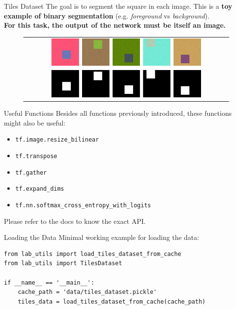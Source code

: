 \documentclass[aspectratio=169]{beamer}
\begin{document}

\begin{frame}{Tiles Dataset}
The goal is to segment the square in each image. This is a \textbf{toy example of binary segmentation} (e.g. \textit{foreground} vs \textit{background}).\\
\vspace{0.5cm}
\textbf{For this task, the output of the network must be itself an image.}
\begin{figure}
\begin{tabular}{c}
\includegraphics[width=0.75\textwidth]{img/tf/tiles_dataset.png}
\end{tabular}
\end{figure}
\end{frame}


\begin{frame}{Useful Functions}
Besides all functions previously introduced, these functions might also be useful:
\begin{itemize}
\item \texttt{tf.image.resize\_bilinear}
\item \texttt{tf.transpose}
\item \texttt{tf.gather}
\item \texttt{tf.expand\_dims}
\item \texttt{tf.nn.softmax\_cross\_entropy\_with\_logits}
\end{itemize}
Please refer to the docs to know the exact API.
\end{frame}


\begin{frame}[fragile]{Loading the Data}
Minimal working example for loading the data:
\begin{verbatim}
from lab_utils import load_tiles_dataset_from_cache
from lab_utils import TilesDataset

if __name__ == '__main__':
    cache_path = 'data/tiles_dataset.pickle'
    tiles_data = load_tiles_dataset_from_cache(cache_path)
\end{verbatim}
\end{frame}
\end{document}
